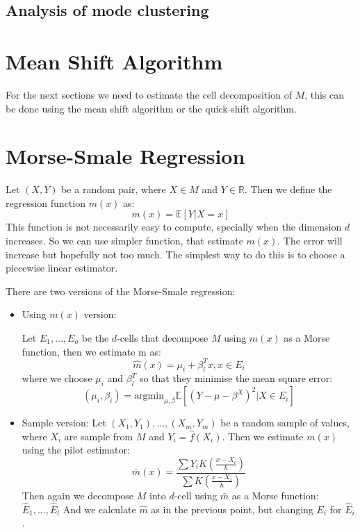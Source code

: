 \subsection{Analysis of mode clustering}


\section{Mean Shift Algorithm}

For the next sections we need to estimate the cell decomposition of $M$, this can be done
using the mean shift algorithm or the quick-shift algorithm.

\section{Morse-Smale Regression}

Let $(X,Y)$ be a random pair, where $X\in M$ and $Y\in\mathbb{R}$.
Then we define the regression function $m(x)$ as:
$$
m(x)=\mathbb{E}[Y\vert X=x]
$$
This function is not necessarily easy to compute, specially when the dimension $d$ increases.
So we can use simpler function, that estimate $m(x)$. The error will increase but hopefully not too much.
The simplest way to do this is to choose a piecewise linear estimator.

There are two versions of the Morse-Smale regression:

\begin{itemize}

    \item Using $m(x)$ version:

        Let $E_1,\ldots,E_o$ be the $d$-cells that decompose $M$ using $m(x)$ 
        as a Morse function,
then we estimate m as:
$$
\hat{m}(x)=\mu_i+\beta_l^T x, x\in E_i
$$
where we choose $\mu_i$ and $\beta_l^T$ so that they minimise the mean square error:
$$
(\mu_i,\beta_i)
=
\text{argmin}_{\mu,\beta}
\mathbb{E}[
    (
    Y-
    \mu-\beta^X
    )^2
    \vert X\in E_i
]
$$

\item Sample version:
    Let $(X_1,Y_1),\ldots,(X_m,Y_m)$ be a random sample of values, where $X_i$ are sample from $M$
        and $Y_i=\hat f(X_i)$. Then we estimate $m(x)$ using the pilot estimator:
        $$
        \bar{m}(x)=
        \frac{
            \sum Y_iK(\frac{x-X_i}{h})
        }
        {
            \sum K(\frac{x-X_i}{h})
        }
        $$
        Then again we decompose $M$ into $d$-cell using  $\bar m$ as a Morse function:$\hat E_1,\ldots,\hat E_l$
        And we calculate $\hat{m}$ as in the previous point, but changing $E_i$ for $\hat E_i$.
\end{itemize}



